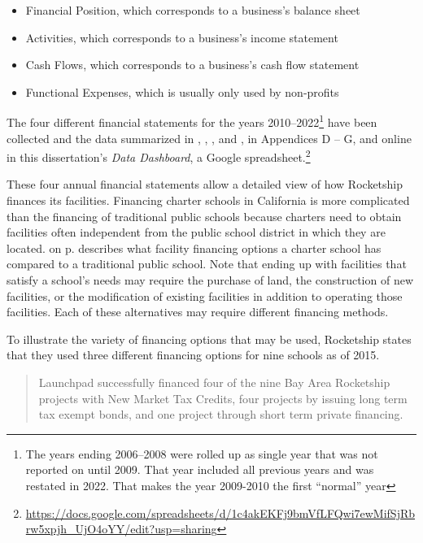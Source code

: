\begin{itemize}
  \item Financial Position, which corresponds to a business's balance sheet
  \item Activities, which corresponds to a business's income statement
  \item Cash Flows, which corresponds to a business's cash flow statement
  \item Functional Expenses, which is usually only used by non-profits
\end{itemize}

The four different financial statements for the years 2010–2022\footnote{The years ending 2006–2008 were rolled up as single year that was not reported on until 2009. That year included all previous years and was restated in 2022. That makes the year 2009-2010 the first ``normal'' year} have been collected and the data summarized in , , , and , in Appendices D – G, and online in this dissertation's \textit{Data Dashboard}, a Google spreadsheet.\footnote{\url{https://docs.google.com/spreadsheets/d/1c4akEKFj9bmVfLFQwi7ewMifSjRbrw5xpjh_UjO4oYY/edit?usp=sharing}}

These four annual financial statements allow a detailed view of how Rocketship finances its facilities. Financing charter schools in California is more complicated than the financing of traditional public schools because charters need to obtain facilities often independent from the public school district in which they are located.
 on p.\pageref{tab:charter-school-financing} describes what facility financing options a charter school has compared to a traditional public school. Note that ending up with facilities that satisfy a school's needs may require the purchase of land, the construction of new facilities, or the modification of existing facilities in addition to operating those facilities. Each of these alternatives may require different financing methods.

To illustrate the variety of financing options that may be used, Rocketship states that they used three different financing options for nine schools as of 2015.
\begin{quotation}\noindent
Launchpad successfully financed four of the nine Bay Area Rocketship projects with New Market Tax Credits, four projects by issuing long term tax exempt bonds, and one project through short term private financing. 
\end{quotation}

